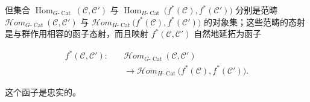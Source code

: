 但集合\allowbreak
$\operatorname{Hom}_{G\text{-}\operatorname{Cat}}(\mathcal C,\mathcal C')$\allowbreak
与\allowbreak
$\operatorname{Hom}_{H\text{-}\operatorname{Cat}}
\bigl(f^*(\mathcal C),f^*(\mathcal C')\bigr)$\allowbreak
分别是范畴\hfill\break
$\mathcal H\!om_{G\text{-}\operatorname{Cat}}(\mathcal C,\mathcal C')$\allowbreak
与\allowbreak
$\mathcal H\!om_{H\text{-}\operatorname{Cat}}
\bigl(f^*(\mathcal C),f^*(\mathcal C')\bigr)$\allowbreak
的对象集；这些范畴的态射是与群作用相容的函子态射，而且映射
$f^*(\mathcal C,\mathcal C')$ 自然地延拓为函子

\begin{equation}
  \begin{aligned}
    f^*(\mathcal C,\mathcal C')\colon\quad
      &\mathcal H\!om_{G\text{-}\operatorname{Cat}}
        (\mathcal C,\mathcal C')\\
      &\longrightarrow
        \mathcal H\!om_{H\text{-}\operatorname{Cat}}
        \bigl(f^*(\mathcal C),f^*(\mathcal C')\bigr).
  \end{aligned}
  \tag{1.4.1.5}
\end{equation}

这个函子是忠实的。
